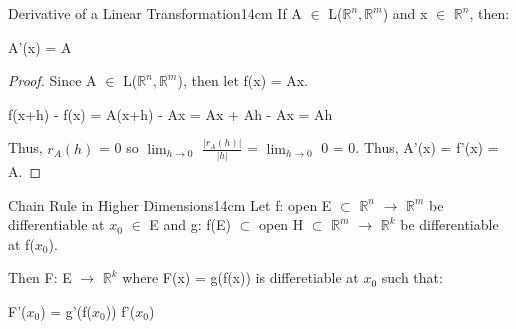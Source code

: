     \begin{wtheorem}{Derivative of a Linear Transformation}{14cm}
        If A $\in$ L($\mathbb{R}^n,\mathbb{R}^m$) and x $\in$ $\mathbb{R}^n$, then:

        \hspace{0.5cm}
        A'(x) = A
    \end{wtheorem}

    \begin{proof}
        Since A $\in$ L($\mathbb{R}^n,\mathbb{R}^m$), then let f(x) = Ax.

        \hspace{0.5cm}
        f(x+h) - f(x)
        = A(x+h) - Ax
        = Ax + Ah - Ax
        = Ah

        Thus, $r_A(h)$  = 0
        so $\lim_{h \rightarrow 0}$ $\frac{|r_A(h)|}{|h|}$
        = $\lim_{h \rightarrow 0}$ 0 = 0. Thus, A'(x) = f'(x) = A.
    \end{proof}

    \vspace{0.5cm}



    \begin{wtheorem}{Chain Rule in Higher Dimensions}{14cm}
        Let f: open E $\subset$ $\mathbb{R}^n$ $\rightarrow$ $\mathbb{R}^m$
        be differentiable at $x_0$ $\in$ E and
        g: f(E) $\subset$ open H $\subset$ $\mathbb{R}^m$ $\rightarrow$
        $\mathbb{R}^k$ be differentiable at f($x_0$).
        
        Then F: E $\rightarrow$ $\mathbb{R}^k$ where F(x) = g(f(x))
        is differetiable at $x_0$ such that:

        \hspace{0.5cm}
        F'($x_0$) = g'(f($x_0$)) f'($x_0$)
    \end{wtheorem}

